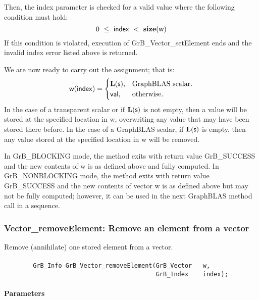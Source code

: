 Then, the {\sf index} parameter is checked for a valid value where the following
condition must hold:
\[
	0\ \leq\ {\sf index}\ <\ \mathbf{size}({\sf w})
\]
If this condition is violated, execution of {\sf GrB\_Vector\_setElement} 
ends and the invalid index error listed above is returned.

We are now ready to carry out the assignment; that is: 
\begin{equation*}
    {\sf w}({\sf index}) =
    \begin{cases}
     \mathbf{L}({\sf s}),  & \text{GraphBLAS scalar.} \\
     {\sf val}, & \text{otherwise.}
    \end{cases}
\end{equation*}
In the case of a transparent scalar or if $\mathbf{L}({\sf s})$ is not empty, then a value will be stored at the specified
location in {\sf w}, overwriting any value that may have been stored there before.
In the case of a GraphBLAS scalar, if $\mathbf{L}({\sf s})$ is empty, then any
value stored at the specified location in {\sf w} will be removed.

In {\sf GrB\_BLOCKING} mode, the method exits with return value 
{\sf GrB\_SUCCESS} and the new contents of {\sf w} is as defined above
and fully computed.  
In {\sf GrB\_NONBLOCKING} mode, the method exits with return value 
{\sf GrB\_SUCCESS} and the new contents of vector {\sf w} is as defined above 
but may not be fully computed; however, it can be used in the next GraphBLAS 
method call in a sequence.


\subsubsection{{\sf Vector\_removeElement}: Remove an element from a vector}

Remove (annihilate) one stored element from a vector.

\paragraph{\syntax}

\begin{verbatim}
        GrB_Info GrB_Vector_removeElement(GrB_Vector   w,
                                          GrB_Index    index);
\end{verbatim}

\paragraph{Parameters}

